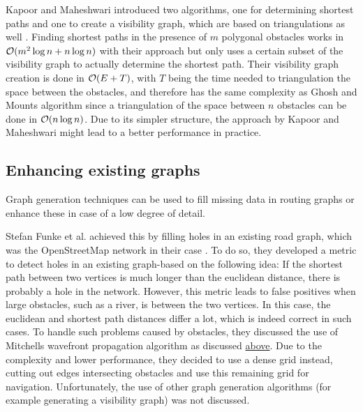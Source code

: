 		Kapoor and Maheshwari introduced two algorithms, one for determining shortest paths and one to create a visibility graph, which are based on triangulations as well \cite{kapoor-shortest-path-vgraph}.
		Finding shortest paths in the presence of $m$ polygonal obstacles works in $\mathcal{O}(m^2 \log{n} + n\log{n})$ with their approach but only uses a certain subset of the visibility graph to actually determine the shortest path.
		Their visibility graph creation is done in $\mathcal{O}(E+T)$, with $T$ being the time needed to triangulation the space between the obstacles, and therefore has the same complexity as Ghosh and Mounts algorithm since a triangulation of the space between $n$ obstacles can be done in $\mathcal{O}(n \log{n})$.
		Due to its simpler structure, the approach by Kapoor and Maheshwari might lead to a better performance in practice.
		
		
	
	\subsection{Enhancing existing graphs}
	
		Graph generation techniques can be used to fill missing data in routing graphs or enhance these in case of a low degree of detail.
		
		Stefan Funke et al. achieved this by filling holes in an existing road graph, which was the OpenStreetMap network in their case \cite{funke-osm-extrapolation}.
		To do so, they developed a metric to detect holes in an existing graph-based on the following idea:
		If the shortest path between two vertices is much longer than the euclidean distance, there is probably a hole in the network.
		However, this metric leads to false positives when large obstacles, such as a river, is between the two vertices.
		In this case, the euclidean and shortest path distances differ a lot, which is indeed correct in such cases.
		To handle such problems caused by obstacles, they discussed the use of Mitchells wavefront propagation algorithm as discussed \hyperref[related-work:mitchell]{above}.
		Due to the complexity and lower performance, they decided to use a dense grid instead, cutting out edges intersecting obstacles and use this remaining grid for navigation.
		Unfortunately, the use of other graph generation algorithms (for example generating a visibility graph) was not discussed.
		
